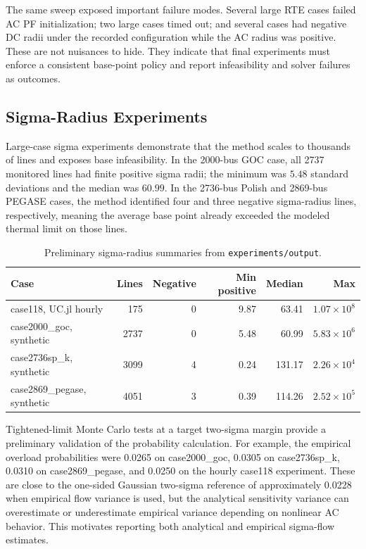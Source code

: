 \documentclass[11pt]{article}
\begin{document}
The same sweep exposed important failure modes. Several large RTE cases failed AC PF initialization; two large cases timed out; and several cases had negative DC radii under the recorded configuration while the AC radius was positive. These are not nuisances to hide. They indicate that final experiments must enforce a consistent base-point policy and report infeasibility and solver failures as outcomes.

\subsection{Sigma-Radius Experiments}

Large-case sigma experiments demonstrate that the method scales to thousands of lines and exposes base infeasibility. In the 2000-bus GOC case, all 2737 monitored lines had finite positive sigma radii; the minimum was $5.48$ standard deviations and the median was $60.99$. In the 2736-bus Polish and 2869-bus PEGASE cases, the method identified four and three negative sigma-radius lines, respectively, meaning the average base point already exceeded the modeled thermal limit on those lines.

\begin{table}[t]
\centering
\caption{Preliminary sigma-radius summaries from \texttt{experiments/output}.}
\label{tab:sigma}
\begin{tabular}{lrrrrr}
\toprule
Case & Lines & Negative & Min positive & Median & Max \\
\midrule
case118, UC.jl hourly & 175 & 0 & 9.87 & 63.41 & $1.07\times 10^8$ \\
case2000\_goc, synthetic & 2737 & 0 & 5.48 & 60.99 & $5.83\times 10^6$ \\
case2736sp\_k, synthetic & 3099 & 4 & 0.24 & 131.17 & $2.26\times 10^4$ \\
case2869\_pegase, synthetic & 4051 & 3 & 0.39 & 114.26 & $2.52\times 10^5$ \\
\bottomrule
\end{tabular}
\end{table}

Tightened-limit Monte Carlo tests at a target two-sigma margin provide a preliminary validation of the probability calculation. For example, the empirical overload probabilities were 0.0265 on case2000\_goc, 0.0305 on case2736sp\_k, 0.0310 on case2869\_pegase, and 0.0250 on the hourly case118 experiment. These are close to the one-sided Gaussian two-sigma reference of approximately 0.0228 when empirical flow variance is used, but the analytical sensitivity variance can overestimate or underestimate empirical variance depending on nonlinear AC behavior. This motivates reporting both analytical and empirical sigma-flow estimates.
\end{document}
